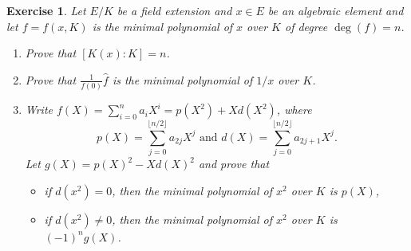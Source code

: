 \documentclass[a4paper,10pt,reqno]{amsart}
\newtheorem{ex}{Exercise}[section]
\begin{document}
\begin{ex}
    Let $E/K$ be a field extension and $x\in E$ be an algebraic element and let $f=f(x,K)$ is the minimal polynomial of $x$ over $K$ of degree $\deg(f)=n$.
    \begin{enumerate}[label=(\roman*)]
    \item Prove that $[K(x):K]=n$.
    \item Prove that $\frac{1}{f(0)}\widehat{f}$ is the minimal polynomial of $1/x$ over $K$.
    \item Write $f(X)=\sum_{i=0}^na_iX^i=p(X^2)+Xd(X^2)$, where 
    \[
    p(X)=\sum_{j=0}^{\lfloor n/2\rfloor } a_{2j}X^{j}\text { and }
    d(X)=\sum_{j=0}^{\lfloor n/2\rfloor } a_{2j+1}X^j.
    \]
    Let $g(X)=p(X)^2-Xd(X)^2$ and prove that
    \begin{itemize}
        \item if $d(x^2)=0$, then the minimal polynomial of $x^2$ over $K$ is $p(X)$,
        \item if $d(x^2)\neq 0$, then the minimal polynomial of $x^2$ over $K$ is $(-1)^ng(X)$.
    \end{itemize}
    \noindent
    \end{enumerate}
\end{ex}
\end{document}
